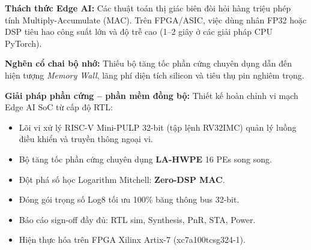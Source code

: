 \documentclass[10pt]{article}
\begin{document}
\noindent
\begin{minipage}[t]{0.323\textwidth}\vspace{0pt}
    \begin{tcolorbox}[colorcard={socBlue}{1. ĐẶT VẤN ĐỀ \& NÚT THẮT SILICON EDGE AI}]
        {\fontsize{8.1}{9.8}\selectfont
        \textbf{Thách thức Edge AI:} Các thuật toán thị giác biên đòi hỏi hàng triệu phép tính Multiply-Accumulate (MAC). Trên FPGA/ASIC, việc dùng nhân FP32 hoặc DSP tiêu hao công suất lớn và độ trễ cao (1--2 giây ở các giải pháp CPU PyTorch).
        
        \textbf{Nghẽn cổ chai bộ nhớ:} Thiếu bộ tăng tốc phần cứng chuyên dụng dẫn đến hiện tượng \textit{Memory Wall}, lãng phí diện tích silicon và tiêu thụ pin nghiêm trọng.
        
        \textbf{Giải pháp phần cứng -- phần mềm đồng bộ:} Thiết kế hoàn chỉnh vi mạch Edge AI SoC từ cấp độ RTL:
        \begin{itemize}[leftmargin=3.5mm, topsep=1.5pt, itemsep=1.0pt]
            \item Lõi vi xử lý RISC-V Mini-PULP 32-bit (tập lệnh RV32IMC) quản lý luồng điều khiển và truyền thông ngoại vi.
            \item Bộ tăng tốc phần cứng chuyên dụng \textbf{LA-HWPE} 16 PEs song song.
            \item Đột phá số học Logarithm Mitchell: \textbf{Zero-DSP MAC}.
            \item Đóng gói trọng số Log8 tối ưu 100\% băng thông bus 32-bit.
            \item Báo cáo sign-off đầy đủ: RTL sim, Synthesis, PnR, STA, Power.
            \item Hiện thực hóa trên FPGA Xilinx Artix-7 (xc7a100tcsg324-1).
        \end{itemize}}
    \end{tcolorbox}
    
    \vspace{4.4mm}
    

\end{minipage}
\end{document}
